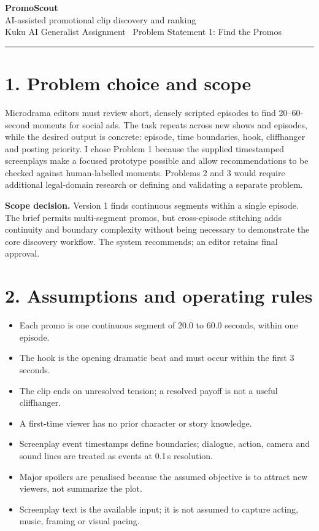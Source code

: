 \documentclass[10pt,a4paper]{extarticle}
\begin{document}
\begin{center}\vspace*{-5pt}
{\LARGE\bfseries\color{navy}PromoScout}\\[-1pt]
{\small\color{muted}AI-assisted promotional clip discovery and ranking}\\
{\footnotesize Kuku AI Generalist Assignment \textbar\ Problem Statement 1: Find the Promos}\\[-2pt]
\end{center}
\vspace{-3pt}
\hrule
\vspace{1pt}

\section{1. Problem choice and scope}
Microdrama editors must review short, densely scripted episodes to find 20--60-second moments for social ads. The task repeats across new shows and episodes, while the desired output is concrete: episode, time boundaries, hook, cliffhanger and posting priority. I chose Problem 1 because the supplied timestamped screenplays make a focused prototype possible and allow recommendations to be checked against human-labelled moments. Problems 2 and 3 would require additional legal-domain research or defining and validating a separate problem.

\textbf{Scope decision.} Version 1 finds continuous segments within a single episode. The brief permits multi-segment promos, but cross-episode stitching adds continuity and boundary complexity without being necessary to demonstrate the core discovery workflow. The system recommends; an editor retains final approval.

\section{2. Assumptions and operating rules}
\begin{itemize}
\item Each promo is one continuous segment of 20.0 to 60.0 seconds, within one episode.
\item The hook is the opening dramatic beat and must occur within the first 3 seconds.
\item The clip ends on unresolved tension; a resolved payoff is not a useful cliffhanger.
\item A first-time viewer has no prior character or story knowledge.
\item Screenplay event timestamps define boundaries; dialogue, action, camera and sound lines are treated as events at 0.1\,s resolution.
\item Major spoilers are penalised because the assumed objective is to attract new viewers, not summarize the plot.
\item Screenplay text is the available input; it is not assumed to capture acting, music, framing or visual pacing.
\end{itemize}
\end{document}
